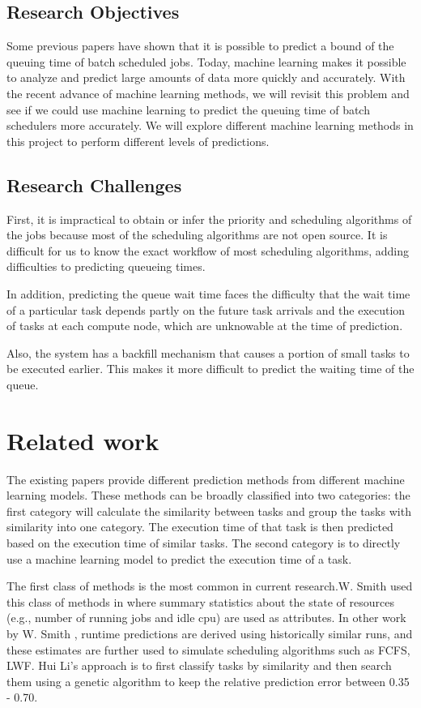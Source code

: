 \documentclass[conference,compsoc]{IEEEtran}
\begin{document}
\subsection{Research Objectives}

Some previous papers have shown that it is possible to predict a bound of the queuing time of batch scheduled jobs. Today, machine learning makes it possible to analyze and predict large amounts of data more quickly and accurately. With the recent advance of machine learning methods, we will revisit this problem and see if we could use machine learning to predict the queuing time of batch schedulers more accurately. We will explore different machine learning methods in this project to perform different levels of predictions.

\subsection{Research Challenges}

First, it is impractical to obtain or infer the priority and scheduling algorithms of the jobs because most of the scheduling algorithms are not open source. It is difficult for us to know the exact workflow of most scheduling algorithms, adding difficulties to predicting queueing times.

In addition, predicting the queue wait time faces the difficulty that the wait time of a particular task depends partly on the future task arrivals and the execution of tasks at each compute node, which are unknowable at the time of prediction.

Also, the system has a backfill mechanism that causes a portion of small tasks to be executed earlier. This makes it more difficult to predict the waiting time of the queue.

\section{Related work}
The existing papers provide different prediction methods from different machine learning models. These methods can be broadly classified into two categories: the first category will calculate the similarity between tasks and group the tasks with similarity into one category. The execution time of that task is then predicted based on the execution time of similar tasks. The second category is to directly use a machine learning model to predict the execution time of a task.

The first class of methods is the most common in current research.W. Smith used this class of methods in \cite{smith1999resource} where summary statistics about the state of resources (e.g., number of running jobs and idle cpu) are used as attributes. In other work by W. Smith \cite{smitharticle}\cite{10.1007/3-540-47954-6_11}, runtime predictions are derived using historically similar runs, and these estimates are further used to simulate scheduling algorithms such as FCFS, LWF. Hui Li's\cite{li2005efficient} approach is to first classify tasks by similarity and then search them using a genetic algorithm to keep the relative prediction error between 0.35 - 0.70.
\end{document}
